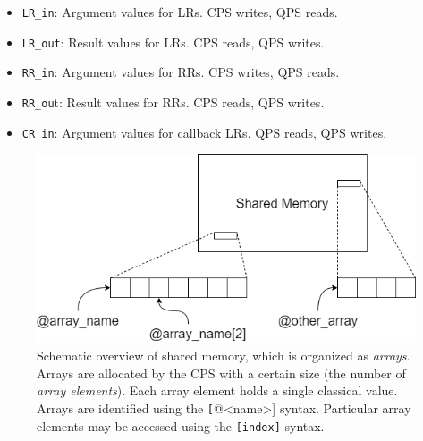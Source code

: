 \begin{itemize}
\item \texttt{LR\_in}: Argument values for LRs. CPS writes, QPS reads.
\item \texttt{LR\_out}: Result values for LRs. CPS reads, QPS writes.
\item \texttt{RR\_in}: Argument values for RRs. CPS writes, QPS reads.
\item \texttt{RR\_ou}t: Result values for RRs. CPS reads, QPS writes.
\item \texttt{CR\_in}: Argument values for callback LRs. QPS reads, QPS writes.
\end{itemize}


\begin{figure}[ht]
    \centering
    \includegraphics[width=\columnwidth]{figures/qoala/arrays.png}
    \caption{Schematic overview of shared memory, which is organized as \textit{arrays}.
    Arrays are allocated by the CPS with a certain size (the number of \textit{array elements}).
    Each array element holds a single classical value.
    Arrays are identified using the \texttt[@<name>] syntax.
    Particular array elements may be accessed using the \texttt{[index]} syntax.
    }
    \label{qoala:fig:app:arrays}
\end{figure}


